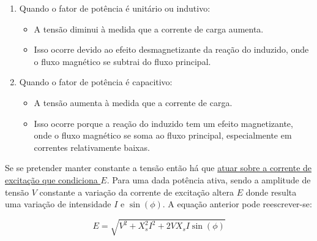 \vspace{0.5em}
\begin{mdframed}
    \begin{enumerate}
        \item Quando o fator de potência é unitário ou indutivo:
        \begin{itemize}
            \item A tensão diminui à medida que a corrente de carga aumenta.
            \item Isso ocorre devido ao efeito desmagnetizante da reação do induzido, onde o fluxo magnético se subtrai do fluxo principal.
        \end{itemize}
    
        \item Quando o fator de potência é capacitivo:
        \begin{itemize}
            \item A tensão aumenta à medida que a corrente de carga.
            \item Isso ocorre porque a reação do induzido tem um efeito magnetizante, onde o fluxo magnético se soma ao fluxo principal, especialmente em correntes relativamente baixas.
        \end{itemize}
    \end{enumerate}
\end{mdframed}

\clearpage
\noindent Se se pretender  manter constante a tensão então há que \underline{atuar sobre a corrente de excitação que condiciona $E$}. Para uma dada potência ativa, sendo a amplitude de tensão $V$ constante a variação da corrente de excitação altera $E$ donde resulta uma variação de intensidade $I$ e $\sin(\phi)$. A equação anterior pode reescrever-se:

$$
    \boxed{E = \sqrt{V^2 + X_s^2I^2 + 2V X_s I \sin(\phi)}}
$$

